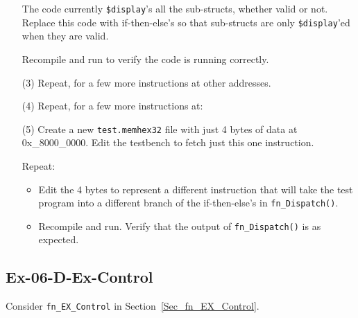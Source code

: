 \begin{itemize}
    The code currently \verb|$display|'s all the sub-structs, whether
    valid or not.  Replace this code with if-then-else's so that
    sub-structs are only \verb|$display|'ed when they are valid.

    Recompile and run to verify the code is running correctly.

\item[(3)] Repeat, for a few more instructions at other addresses.

\item[(4)] Repeat, for a few more instructions at:

\item[(5)] Create a new \verb|test.memhex32| file with just 4 bytes of
    data at 0x\_8000\_0000.  Edit the testbench to fetch just this one
    instruction.

    Repeat:
    \begin{itemize}

    \item Edit the 4 bytes to represent a different instruction that
      will take the test program into a different branch of the
      if-then-else's in \verb|fn_Dispatch()|.

    \item Recompile and run. Verify that the output of
          \verb|fn_Dispatch()| is as expected.

    \end{itemize}

\end{itemize}


\subsection*{Ex-06-D-Ex-Control}

\label{Ex-06-D-Ex-Control}

Consider {\tt fn\_EX\_Control} in Section~\ref{Sec_fn_EX_Control}.

